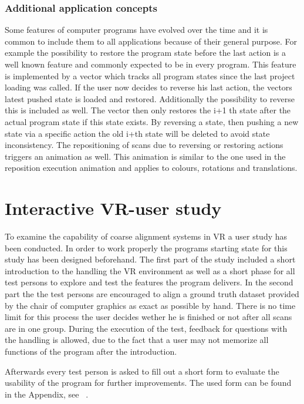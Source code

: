 \documentclass[hyperref,english,bachelorofscience,bibnum,twoside]{cgvpub}
\begin{document}
\subsection{Additional application concepts}

Some features of computer programs have evolved over the time and it is common to include them to all applications because of their general purpose. For example the possibility to restore the program state before the last action is a well known feature and commonly expected to be in every program. %
This feature is implemented by a vector which tracks all program states since the last project loading was called. If the user now decides to reverse his last action, the vectors latest pushed state is loaded and restored. Additionally the possibility to reverse this is included as well. The vector then only restores the i+1 th state after the actual program state if this state exists. By reversing a state, then pushing a new state via a specific action the old i+th state will be deleted to avoid state inconsistency.
The repositioning of scans due to reversing or restoring actions triggers an animation as well. This animation is similar to the one used in the reposition execution animation and applies to colours, rotations and translations.

\chapter{Interactive VR-user study}

To examine the capability of coarse alignment systems in VR a user study has been conducted. In order to work properly the programs starting state for this study has been designed beforehand. The first part of the study included a short introduction to the handling the VR environment as well as a short phase for all test persons to explore and test the features the program delivers. In the second part the the test persons are encouraged to align a ground truth dataset provided by the chair of computer graphics as exact as possible by hand. %
There is no time limit for this process the user decides wether he is finished or not after all scans are in one group. During the execution of the test, feedback for questions with the handling is allowed, due to the fact that a user may not memorize all functions of the program after the introduction.

Afterwards every test person is asked to fill out a short form to evaluate the usability of the program for further improvements. The used form can be found in the Appendix, see ~.
\end{document}
